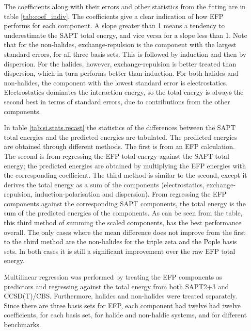 
The coefficients along with their errors and other statistics from the fitting are in table 
\ref{tab:coef_indiv}.
The coefficients give a clear indication of how EFP performs for each component.
A slope greater than 1 means a tendency to underestimate the SAPT total energy, and vice versa for a slope less than 1. 
Note that for the non-halides, exchange-repulsion is the component with the largest standard errors, for all three basis sets.
This is followed by induction and then by dispersion.
For the halides, however, exchange-repulsion is better treated than dispersion, which in turn performs better than induction.
For both halides and non-halides, the component with the lowest standard error is electrostatics. 
Electrostatics dominates the interaction energy, so the total energy is always the second best in terms of standard errors, due to contributions from the other components.

In table 
\ref{tab:si.stats.recast}
the statistics of the differences between the SAPT total energies and the predicted energies are tabulated.
The predicted energies are obtained through different methods. 
The first is from an EFP calculation.
The second is from regressing the EFP total energy against the SAPT total energy; the predicted energies are obtained by multiplying the EFP energies with the corresponding coefficient.
The third method is similar to the second, except it derives the total energy as a sum of the components (electrostatics, exchange-repulsion, induction-polarisation and dispersion).
From regressing the EFP components against the corresponding SAPT components, the total energy is the sum of the predicted energies of the components.
As can be seen from the table, this third method of summing the scaled components, has the best performance overall.
The only cases where the mean difference does not improve from the first to the third method are the non-halides for the triple zeta and the Pople basis sets.
In both cases it is still a significant improvement over the raw EFP total energy.



Multilinear regression was performed by treating the EFP components as predictors and regressing against the total energy from both SAPT2+3 and CCSD(T)/CBS.
Furthermore, halides and non-halides were treated separately.
Since there are three basis sets for EFP, each component had twelve had twelve coefficients, for each basis set, for halide and non-haldie systems, and for different benchmarks.


